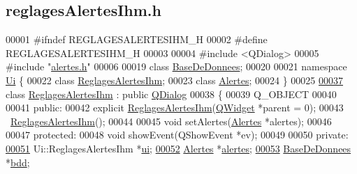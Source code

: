 \hypertarget{reglages_alertes_ihm_8h_source}{}\subsection{reglages\+Alertes\+Ihm.\+h}
\label{reglages_alertes_ihm_8h_source}

\begin{DoxyCode}
00001 \textcolor{preprocessor}{#ifndef REGLAGESALERTESIHM\_H}
00002 \textcolor{preprocessor}{#define REGLAGESALERTESIHM\_H}
00003 
00004 \textcolor{preprocessor}{#include <QDialog>}
00005 \textcolor{preprocessor}{#include "\hyperlink{alertes_8h}{alertes.h}"}
00006 
00019 \textcolor{keyword}{class }\hyperlink{class_base_de_donnees}{BaseDeDonnees};
00020 
00021 \textcolor{keyword}{namespace }\hyperlink{namespace_ui}{Ui} \{
00022 \textcolor{keyword}{class }\hyperlink{class_reglages_alertes_ihm}{ReglagesAlertesIhm};
00023 \textcolor{keyword}{class }\hyperlink{class_alertes}{Alertes};
00024 \}
00025 
\hyperlink{class_reglages_alertes_ihm}{00037} \textcolor{keyword}{class }\hyperlink{class_reglages_alertes_ihm}{ReglagesAlertesIhm} : \textcolor{keyword}{public} \hyperlink{class_q_dialog}{QDialog}
00038 \{
00039     Q\_OBJECT
00040 
00041 \textcolor{keyword}{public}:
00042     \textcolor{keyword}{explicit} \hyperlink{class_reglages_alertes_ihm}{ReglagesAlertesIhm}(\hyperlink{class_q_widget}{QWidget} *parent = 0);
00043     ~\hyperlink{class_reglages_alertes_ihm}{ReglagesAlertesIhm}();
00044 
00045     \textcolor{keywordtype}{void} setAlertes(\hyperlink{class_alertes}{Alertes} *alertes);
00046 
00047 \textcolor{keyword}{protected}:
00048       \textcolor{keywordtype}{void} showEvent(QShowEvent *ev);
00049 
00050 \textcolor{keyword}{private}:
\hyperlink{class_reglages_alertes_ihm_af3a1fcc84fb1c76248b330372947b245}{00051}     Ui::ReglagesAlertesIhm *\hyperlink{class_reglages_alertes_ihm_af3a1fcc84fb1c76248b330372947b245}{ui};
\hyperlink{class_reglages_alertes_ihm_a9afa97e737d3c6a9a28a23fc4bc4beeb}{00052}     \hyperlink{class_alertes}{Alertes} *\hyperlink{class_reglages_alertes_ihm_a9afa97e737d3c6a9a28a23fc4bc4beeb}{alertes};
\hyperlink{class_reglages_alertes_ihm_a91b511776c98009cf8f951ec9f3e564e}{00053}     \hyperlink{class_base_de_donnees}{BaseDeDonnees} *\hyperlink{class_reglages_alertes_ihm_a91b511776c98009cf8f951ec9f3e564e}{bdd}; 

\end{DoxyCode}
